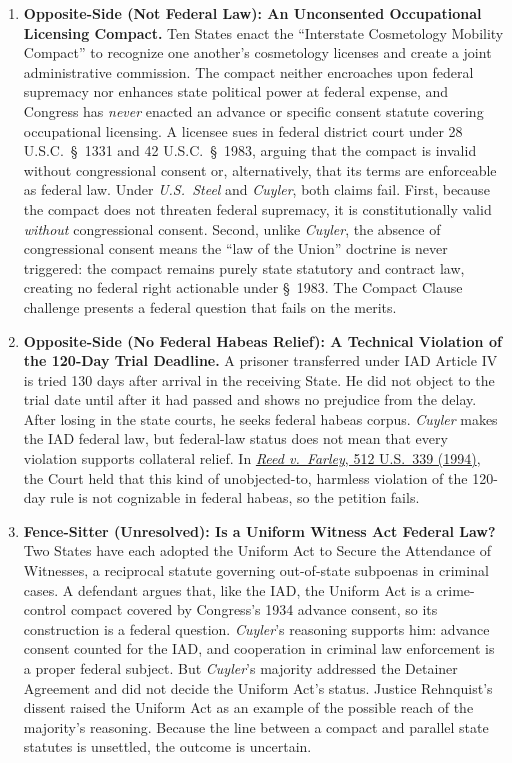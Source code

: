 \documentclass[12pt]{article}
\begin{document}
\begin{enumerate}
\item \textbf{Opposite-Side (Not Federal Law): An Unconsented Occupational Licensing Compact.} Ten States enact the ``Interstate Cosmetology Mobility Compact'' to recognize one another's cosmetology licenses and create a joint administrative commission. The compact neither encroaches upon federal supremacy nor enhances state political power at federal expense, and Congress has \textit{never} enacted an advance or specific consent statute covering occupational licensing. A licensee sues in federal district court under 28 U.S.C.\ \S\ 1331 and 42 U.S.C.\ \S\ 1983, arguing that the compact is invalid without congressional consent or, alternatively, that its terms are enforceable as federal law. Under \textit{U.S.\ Steel} and \textit{Cuyler}, both claims fail. First, because the compact does not threaten federal supremacy, it is constitutionally valid \textit{without} congressional consent. Second, unlike \textit{Cuyler}, the absence of congressional consent means the ``law of the Union'' doctrine is never triggered: the compact remains purely state statutory and contract law, creating no federal right actionable under \S\ 1983. The Compact Clause challenge presents a federal question that fails on the merits.

\item \textbf{Opposite-Side (No Federal Habeas Relief): A Technical Violation of the 120-Day Trial Deadline.} A prisoner transferred under IAD Article IV is tried 130 days after arrival in the receiving State. He did not object to the trial date until after it had passed and shows no prejudice from the delay. After losing in the state courts, he seeks federal habeas corpus. \textit{Cuyler} makes the IAD federal law, but federal-law status does not mean that every violation supports collateral relief. In \href{https://supreme.justia.com/cases/federal/us/512/339/}{\textit{Reed v.\ Farley}, 512 U.S.\ 339 (1994)}, the Court held that this kind of unobjected-to, harmless violation of the 120-day rule is not cognizable in federal habeas, so the petition fails.

\item \textbf{Fence-Sitter (Unresolved): Is a Uniform Witness Act Federal Law?} Two States have each adopted the Uniform Act to Secure the Attendance of Witnesses, a reciprocal statute governing out-of-state subpoenas in criminal cases. A defendant argues that, like the IAD, the Uniform Act is a crime-control compact covered by Congress's 1934 advance consent, so its construction is a federal question. \textit{Cuyler}'s reasoning supports him: advance consent counted for the IAD, and cooperation in criminal law enforcement is a proper federal subject. But \textit{Cuyler}'s majority addressed the Detainer Agreement and did not decide the Uniform Act's status. Justice Rehnquist's dissent raised the Uniform Act as an example of the possible reach of the majority's reasoning. Because the line between a compact and parallel state statutes is unsettled, the outcome is uncertain.

\end{enumerate}
\end{document}

